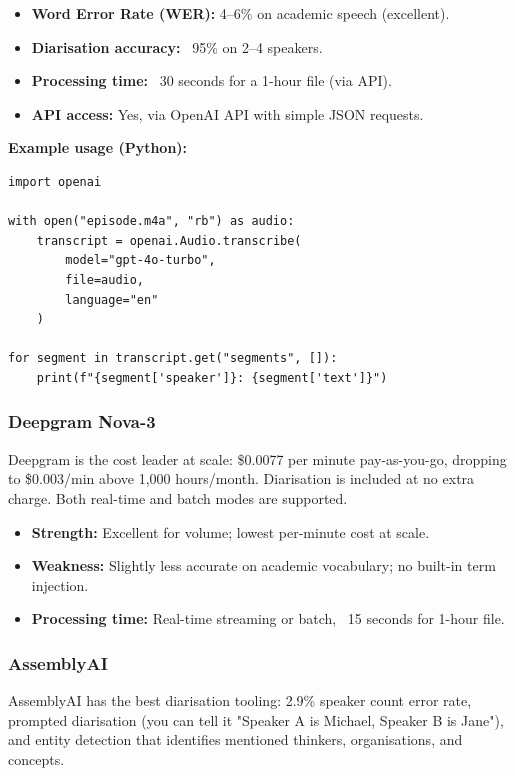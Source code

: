 \documentclass[11pt,letterpaper]{article}
\begin{document}
\begin{itemize}
  \item \textbf{Word Error Rate (WER):} 4–6\% on academic speech (excellent).
  \item \textbf{Diarisation accuracy:} ~95\% on 2–4 speakers.
  \item \textbf{Processing time:} ~30 seconds for a 1-hour file (via API).
  \item \textbf{API access:} Yes, via OpenAI API with simple JSON requests.
\end{itemize}

\textbf{Example usage (Python):}
\begin{verbatim}
import openai

with open("episode.m4a", "rb") as audio:
    transcript = openai.Audio.transcribe(
        model="gpt-4o-turbo",
        file=audio,
        language="en"
    )

for segment in transcript.get("segments", []):
    print(f"{segment['speaker']}: {segment['text']}")
\end{verbatim}

\subsubsection{Deepgram Nova-3}

Deepgram is the cost leader at scale: \$0.0077 per minute pay-as-you-go, dropping to \$0.003/min above 1,000 hours/month. Diarisation is included at no extra charge. Both real-time and batch modes are supported.

\begin{itemize}
  \item \textbf{Strength:} Excellent for volume; lowest per-minute cost at scale.
  \item \textbf{Weakness:} Slightly less accurate on academic vocabulary; no built-in term injection.
  \item \textbf{Processing time:} Real-time streaming or batch, ~15 seconds for 1-hour file.
\end{itemize}

\subsubsection{AssemblyAI}

AssemblyAI has the best diarisation tooling: 2.9\% speaker count error rate, prompted diarisation (you can tell it "Speaker A is Michael, Speaker B is Jane"), and entity detection that identifies mentioned thinkers, organisations, and concepts.
\end{document}
